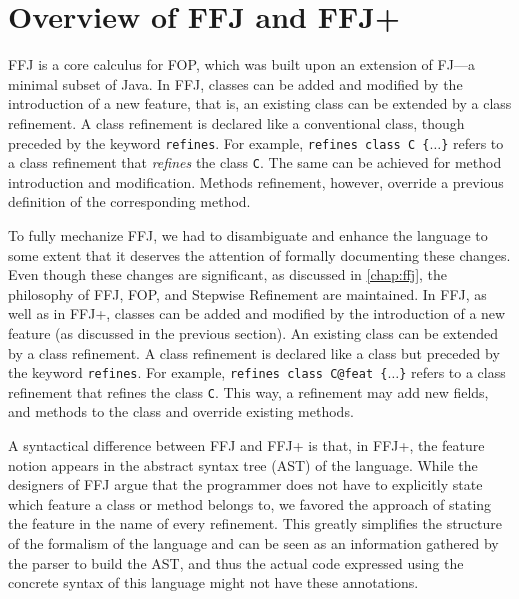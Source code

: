 \chapter{Overview of \gls{FFJ} and \gls{FFJ+}}\label{chap:offj}

\gls{FFJ} is a core calculus for \gls{FOP}, which was built 
upon an extension of \gls{FJ}---a minimal subset of Java. 
In \gls{FFJ}, classes can be added and modified by the 
introduction of a new feature, that is, 
an existing class can be extended by a class refinement. 
A class refinement is declared like a conventional class, though 
preceded by the keyword \texttt{refines}. For example, 
\texttt{refines class C \{$\dots$\}} refers to a class
refinement that
\emph{refines} the class \texttt{C}. The same can be achieved 
for method introduction and modification. Methods refinement,
however, override a previous definition of the corresponding 
method.
 
To fully mechanize \gls{FFJ}, we had to disambiguate and enhance 
the language to some extent that it  deserves the attention of 
formally documenting these changes. 
Even though these changes are significant, as discussed in \cref{chap:ffj}, 
the philosophy of \gls{FFJ}, \gls{FOP}, and Stepwise Refinement are maintained.
In \gls{FFJ}, as well as in \gls{FFJ+}, classes can be added and 
modified by the introduction of a new feature (as discussed in the previous section).
An existing class can be extended by a class refinement. A class refinement is declared like a class but
preceded by the keyword \texttt{refines}. For example, \texttt{refines class C@feat \{$\dots$\}} refers to a class refinement that
refines the class \texttt{C}. This way, a refinement may add new fields, and methods to the class
and override existing methods.  

A syntactical difference between \gls{FFJ} and \gls{FFJ+} is that, in \gls{FFJ+}, 
the feature notion appears in the abstract syntax tree (AST) of the language.
While the designers of \gls{FFJ} argue that the programmer does not have 
to explicitly state which feature a class or method belongs to, 
we favored the approach of stating the feature in the name of every refinement.
This greatly simplifies the structure of the formalism of the language and can be 
seen as an information gathered by the parser to build the AST, and thus 
the actual code expressed using the concrete syntax of this language 
might not have these annotations.

